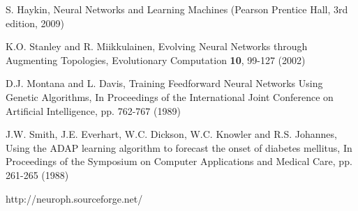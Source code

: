 \documentclass[oneside,11pt]{Latex/Classes/PhDthesisPSnPDF}
\begin{document}
\begin{multicols}{2} %
\begin{tiny} %



\end{tiny}
\end{multicols}







%

%



\begin{thebibliography}{50}


 S. Haykin, Neural Networks and Learning Machines (Pearson Prentice Hall, 3rd edition, 2009)


 K.O. Stanley and R. Miikkulainen, Evolving Neural Networks through Augmenting Topologies, Evolutionary Computation \textbf{10}, 99-127 (2002)

 D.J. Montana and L. Davis, Training Feedforward Neural Networks Using Genetic Algorithms, In Proceedings of the International Joint Conference on Artificial Intelligence, pp. 762-767 (1989)

  J.W. Smith, J.E. Everhart, W.C. Dickson, W.C. Knowler and  
R.S. Johannes, Using the ADAP learning algorithm to forecast the onset of 
diabetes mellitus, In Proceedings of the Symposium on Computer 
Applications and Medical Care, pp. 261-265 (1988)


 http://neuroph.sourceforge.net/

\end{thebibliography}
\end{document}
